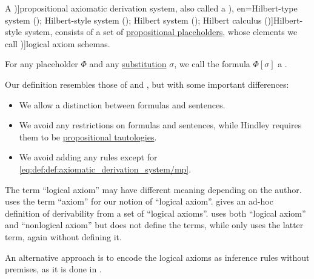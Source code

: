 \begin{definition}\label{def:axiomatic_derivation_system}\mimprovised
  A \term[en=axiomatic system (\cite[6D1]{Hindley1997})]{propositional axiomatic derivation system}, also called a \term[ru=исчисление высказываний гильбертовского типа (\cite[35]{Герасимов2011}), en=Hilbert-type system (\cite[80]{Smullyan1995}); Hilbert-style system (\cite[6D1]{Hindley1997}); Hilbert system (\cite[33]{TroelstraSchwichtenberg2000}); Hilbert calculus (\cite[103]{Mimram2020})]{Hilbert-style system}, consists of a set of \hyperref[def:propositional_formula_placeholder]{propositional placeholders}, whose elements we call \term[en=axiom schema (\cite[80]{Smullyan1995})]{logical axiom schemas}.

  For any placeholder \( \Phi \) and any \hyperref[def:uniform_placeholder_substitution]{substitution} \( \sigma \), we call the formula \( \Phi[\sigma] \) a .
\end{definition}
\begin{comments}
  \item Our definition resembles those of  and , but with some important differences:
  \begin{itemize}
    \item We allow a distinction between formulas and sentences.
    \item We avoid any restrictions on formulas and sentences, while Hindley requires them to be \hyperref[def:propositional_tautology]{propositional tautologies}.
    \item We avoid adding any rules except for \eqref{eq:def:def:axiomatic_derivation_system/mp}.
  \end{itemize}

  \item The term \enquote{logical axiom} may have different meaning depending on the author.  uses the term \enquote{axiom} for our notion of \enquote{logical axiom}.  gives an ad-hoc definition of derivability from a set of \enquote{logical axioms}.  uses both \enquote{logical axiom} and \enquote{nonlogical axiom} but does not define the terms, while  only uses the latter term, again without defining it.

  \item An alternative approach is to encode the logical axioms as inference rules without premises, as it is done in \cite[103]{Mimram2020}.
\end{comments}

